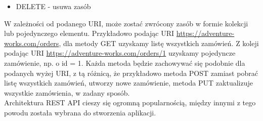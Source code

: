 \documentclass[12pt]{article}
\begin{document}
\begin{sloppypar}
{{\begin{itemize}
    \item DELETE - usuwa zasób
  \end{itemize}
  W zależności od podanego URI, może zostać zwrócony zasób w formie kolekcji lub pojedynczego elementu. 
  Przykładowo podając URI \url{https://adventure-works.com/orders}, dla metody GET uzyskamy listę wszystkich zamówień. 
  Z koleji podając URI \url{https://adventure-works.com/orders/1} uzyskamy pojedyncze zamówienie, np. o id = 1.
  Każda metoda będzie zachowywać się podobnie dla podanych wyżej URI, z tą różnicą, że przykładowo metoda POST zamiast pobrać listę wszystkich zamówień, utworzy nowe zamówienie, 
  metoda PUT zaktualizuje wszystkie zamówienia, w zadany sposób.\\
  Architektura REST API cieszy się ogromną popularnością, między innymi z tego powodu została wybrana do stworzenia aplikacji.
}
}
\end{sloppypar}
\end{document}

